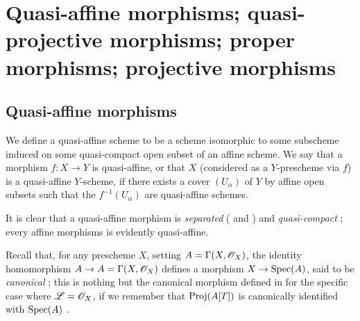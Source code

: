 \section{Quasi-affine morphisms; quasi-projective morphisms; proper morphisms; projective morphisms}
\label{section:quasi-affine-projective-proper-morphisms}

\subsection{Quasi-affine morphisms}
\label{subsection:quasi-affine-morphisms}

\begin{defn}[5.1.1]
\label{2.5.1.1}
We define a quasi-affine scheme to be a scheme isomorphic to some subscheme induced on some quasi-compact open subset of an affine scheme.
We say that a morphism $f:X\to Y$ is quasi-affine, or that $X$ (considered as a $Y$-prescheme via $f$) is a quasi-affine $Y$-scheme, if there exists a cover $(U_\alpha)$ of $Y$ by affine open subsets such that the $f^{-1}(U_\alpha)$ are quasi-affine schemes.
\end{defn}

It is clear that a quasi-affine morphism is \emph{separated} ( and ) and \emph{quasi-compact} ;
every affine morphisms is evidently quasi-affine.

Recall that, for any prescheme $X$, setting $A=\Gamma(X,\mathscr{O}_X)$, the identity homomorphism $A\to A=\Gamma(X,\OO_X)$ defines a morphism $X\to\Spec(A)$, said to be \emph{canonical} ;
this is nothing but the canonical morphism defined in  for the specific case where $\mathscr{L}=\mathscr{O}_X$, if we remember that ${\mathop{\mathrm{Proj}}\nolimits}(A[T])$ is canonically identified with ${\mathop{\mathrm{Spec}}\nolimits}(A)$ .

